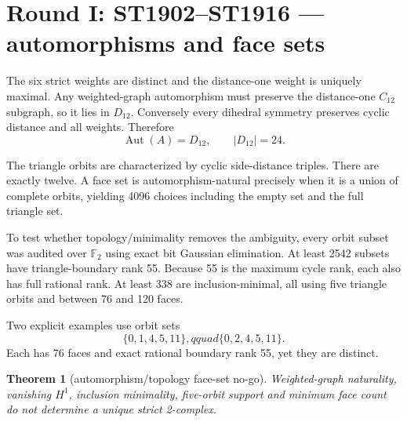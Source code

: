 \documentclass[11pt,a4paper]{article}
\newtheorem{theorem}{Theorem}\newcommand{\status}[1]{\textsf{[#1]}}
\begin{document}
\begin{abstract}
The full clique complex is a canonical support-only object, but it is the
11-simplex with 4096 simplices.  Its flag construction does not preserve the
exact product refinement; the product Hodge repair is not support-only and
still needs inner-product weights, cutoff scale and representations.

The decisive next theorem is therefore narrower and stronger than ``find a
2-complex'': classify all positive face inner products for which gauge
curvature energy commutes with FIN coarse/refinement maps over
$12\to24\to48$, and determine whether they are unique up to one overall
scale.  Failure would be a direct no-go for strict gauge geometry without new
assumptions.
\end{abstract}

\tableofcontents\newpage

\section{Round I: ST1902--ST1916 --- automorphisms and face sets}

The six strict weights are distinct and the distance-one weight is uniquely
maximal.  Any weighted-graph automorphism must preserve the distance-one
$C_{12}$ subgraph, so it lies in $D_{12}$.  Conversely every dihedral symmetry
preserves cyclic distance and all weights.  Therefore
\[
\operatorname{Aut}(A)=D_{12},\qquad|D_{12}|=24.
\]

The triangle orbits are characterized by cyclic side-distance triples.  There
are exactly twelve.  A face set is automorphism-natural precisely when it is a
union of complete orbits, yielding 4096 choices including the empty set and
the full triangle set.

To test whether topology/minimality removes the ambiguity, every orbit subset
was audited over $\mathbb F_2$ using exact bit Gaussian elimination.  At least
2542 subsets have triangle-boundary rank 55.  Because 55 is the maximum cycle
rank, each also has full rational rank.  At least 338 are inclusion-minimal,
all using five triangle orbits and between 76 and 120 faces.

Two explicit examples use orbit sets
\[
\{0,1,4,5,11\},qquad \{0,2,4,5,11\}.
\]
Each has 76 faces and exact rational boundary rank 55, yet they are distinct.

\begin{theorem}[automorphism/topology face-set no-go]
Weighted-graph naturality, vanishing $H^1$, inclusion minimality, five-orbit
support and minimum face count do not determine a unique strict 2-complex.
\end{theorem}
\end{document}
